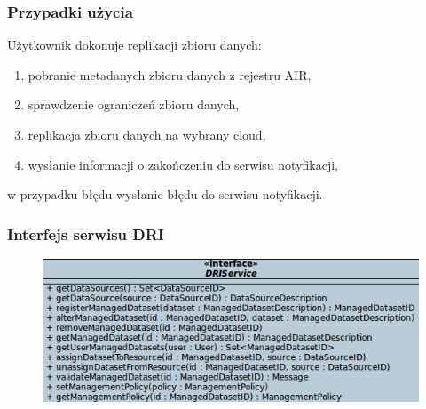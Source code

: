 \documentclass{beamer}
\begin{document}
\begin{frame}
\frametitle{Przypadki użycia}
\begin{block}{Użytkownik dokonuje replikacji zbioru danych:}
\begin{enumerate}
	\item pobranie metadanych zbioru danych z rejestru AIR,
	\item sprawdzenie ograniczeń zbioru danych, 
	\item replikacja zbioru danych na wybrany cloud,
	\item wysłanie informacji o zakończeniu do serwisu notyfikacji,
\end{enumerate}
w przypadku błędu wysłanie błędu do serwisu notyfikacji.
\end{block}
\end{frame}

\begin{frame}
\frametitle{Interfejs serwisu DRI}
\begin{figure}
\includegraphics[width=1.0\textwidth]{dri_interface.png}
\end{figure}
\end{frame}
\end{document}
